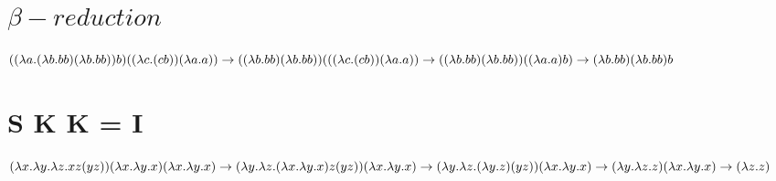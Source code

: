 \documentclass{article}
\begin{document}
\section{$\beta-reduction$}
$((\lambda a.(\lambda b.b b) (\lambda b.b b)) b) ((\lambda c.(c b)) (\lambda a.a)) 
\to\\
((\lambda b.b b) (\lambda b.b b)) (((\lambda c.(c b)) (\lambda a.a))
\to\\
((\lambda b.b b) (\lambda b.b b)) ((\lambda a.a) b)
\to\\
(\lambda b.b b) (\lambda b.b b) b $

\section{S K K = I}
$(\lambda x.\lambda y.\lambda z.x z (y z)) (\lambda x.\lambda y.x) (\lambda x.\lambda y.x)
\to\\
(\lambda y.\lambda z.(\lambda x.\lambda y.x) z (y z)) (\lambda x.\lambda y.x)
\to\\ 
(\lambda y.\lambda z.(\lambda y.z) (y z)) (\lambda x.\lambda y.x)
\to\\ 
(\lambda y.\lambda z.z) (\lambda x.\lambda y.x)
\to\\
(\lambda z.z)$
\end{document}
